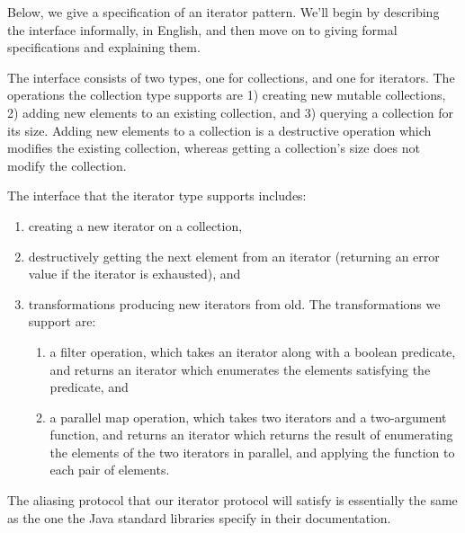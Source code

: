 Below, we give a specification of an iterator pattern. We'll begin 
by describing the interface informally, in English, and then move on 
to giving formal specifications and explaining them. 

The interface consists of two types, one for collections, and one for
iterators. The operations the collection type supports are 1) creating
new mutable collections, 2) adding new elements to an existing
collection, and 3) querying a collection for its size. Adding new
elements to a collection is a destructive operation which modifies the
existing collection, whereas getting a collection's size does not
modify the collection.

The interface that the iterator type supports includes:
\begin{enumerate}
\item creating a new iterator on a collection,
\item destructively getting the next element from an iterator
  (returning an error value if the iterator is exhausted), and
\item transformations producing new iterators from old. The 
  transformations we support are:
  \begin{enumerate}
  \item a filter operation, which takes an iterator along with a
    boolean predicate, and returns an iterator which enumerates the
    elements satisfying the predicate, and
  \item a parallel map operation, which takes two iterators and a
    two-argument function, and returns an iterator which returns the
    result of enumerating the elements of the two iterators in
    parallel, and applying the function to each pair of elements.
  \end{enumerate}
\end{enumerate}

The aliasing protocol that our iterator protocol will satisfy is
essentially the same as the one the Java standard libraries specify in
their documentation.

